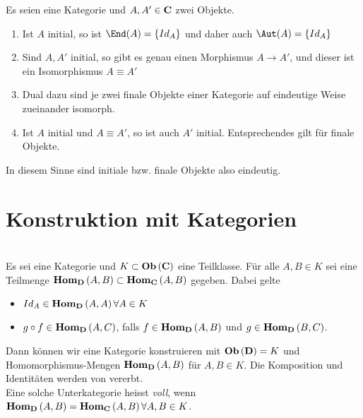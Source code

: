 \documentclass{article}
\renewcommand{\id}{\ensuremath{Id}}
\begin{document}
	\begin{lem}[Eindeutigkeit]
	 {\cite[Lemma 2.5.5]{Bra}}
		Es seien \CatC eine Kategorie und 
		\(A , A' \in \mathbf{C} \) zwei Objekte.
		\begin{enumerate}
			\item Ist \(A \) initial, so ist \( \End(A)= \left\lbrace \id_A \right\rbrace \) und daher auch \( \Aut(A)=\left\lbrace \id_A \right\rbrace \)
			\item Sind \( A,A' \) initial, so gibt es genau einen Morphismus \( A \to A' \), und dieser ist ein Isomorphismus \( A \equiv A' \) 
			\item Dual dazu sind je zwei finale Objekte einer Kategorie auf eindeutige Weise zueinander isomorph.
			\item Ist \( A \) initial und \( A \equiv A' \), so ist auch \( A' \) initial. Entsprechendes gilt f\"ur finale Objekte.
		\end{enumerate}
		In diesem Sinne sind initiale bzw. finale Objekte also eindeutig.
	\end{lem}
\newpage

\section{Konstruktion mit Kategorien}

	\begin{defi}[Unterkategorie] {\cite[Definition 2.6.1]{Bra}} \\
		Es sei \CatC eine Kategorie und \( K \subset  \mathbf{Ob} \left(\mathbf{C}\right) \) eine Teilklasse. F\"ur alle \( A,B \in K \) sei eine Teilmenge
		\(
			 \mathbf{Hom } _\mathbf{D} \left( A, B \right) \subset  \mathbf{Hom } _\mathbf{C} \left( A, B \right)
		\)
		gegeben. Dabei gelte
			\begin{itemize}
				\item \( \id_A \in \Hom_\CatD \left( A, A \right) \forall A \in K \)
				\item \( g \circ f \in   \mathbf{Hom } _\mathbf{D} \left( A,C \right) \), 
					falls \( f \in  \mathbf{Hom } _\mathbf{D} \left( A, B \right) \) und  
					\( g \in  \mathbf{Hom } _\mathbf{D} \left( B , C \right) \).
			\end{itemize}

		Dann k\"onnen wir eine Kategorie \CatD konstruieren mit \(  \mathbf{Ob}  \left( \mathbf{D} \right) = K \) und Homomorphismus-Mengen \(  \mathbf{Hom } _\mathbf{D} \left(A,B \right) \) f\"ur \( A,B \in K \). Die Komposition und Identit\"aten werden von \CatC vererbt.
		\\
		Eine solche Unterkategorie heisst \emph{voll},
		wenn \(  \mathbf{Hom } _\mathbf{D} \left( A,B \right) =  \mathbf{Hom } _\mathbf{C} \left(A,B \right) \forall A,B \in K \). \\
	\end{defi}
 
\end{document}
